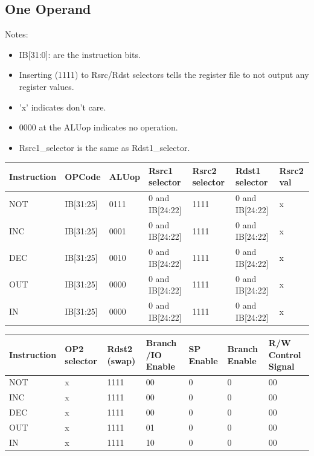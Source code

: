 \documentclass[12pt]{report}
\begin{document}
\subsection{One Operand}
Notes:
\begin{itemize}
    \item IB[31:0]: are the instruction bits.
    \item Inserting (1111) to Rsrc/Rdst selectors tells the register file to not output any register values.
    \item 'x' indicates don't care.
    \item 0000 at the ALUop indicates no operation.
    \item Rsrc1\_selector is the same as Rdst1\_selector.
\end{itemize}

\begin{center}
\begin{tabular}{||p{20mm}| p{15mm}| p{15mm}| p{15mm}| p{15mm}| p{15mm}| p{10mm}||} 
\hline
Instruction & OPCode & ALUop & Rsrc1 selector & Rsrc2 selector & Rdst1 selector & Rsrc2 val \\ [0.5ex] 
\hline\hline
NOT & IB[31:25] & 0111 & 0 and IB[24:22] & 1111 & 0 and IB[24:22] & x  \\
\hline
INC & IB[31:25] & 0001 & 0 and IB[24:22] & 1111 & 0 and IB[24:22] & x \\
\hline
DEC & IB[31:25] & 0010 & 0 and IB[24:22] & 1111 & 0 and IB[24:22] & x \\
\hline
OUT & IB[31:25] & 0000 & 0 and IB[24:22] & 1111 & 0 and IB[24:22] & x \\
\hline
IN  & IB[31:25] & 0000 & 0 and IB[24:22] & 1111 & 0 and IB[24:22] & x \\
\hline

\end{tabular}
\end{center}

\begin{center}
\begin{tabular}{||p{20mm}| p{10mm}| p{10mm}| p{15mm}| p{10mm}| p{15mm}| p{10mm}||} 
\hline
Instruction & OP2 selector & Rdst2 (swap) & Branch /IO Enable & SP Enable & Branch Enable & R/W Control Signal \\ [0.5ex] 
\hline\hline
NOT & x & 1111 & 00 & 0 & 0 & 00 \\
\hline
INC & x & 1111 & 00 & 0 & 0 & 00 \\
\hline
DEC & x & 1111 & 00 & 0 & 0 & 00 \\
\hline
OUT & x & 1111 & 01 & 0 & 0 & 00 \\
\hline
IN  & x & 1111 & 10 & 0 & 0 & 00 \\
\hline

\end{tabular}
\end{center}
\end{document}
